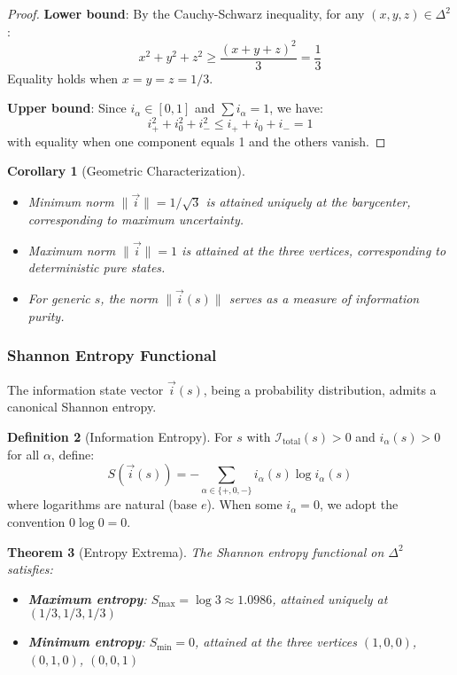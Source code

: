 \documentclass[12pt]{article}
\theoremstyle{plain}
\newtheorem{theorem}{Theorem}[section]
\newtheorem{corollary}[theorem]{Corollary}
\theoremstyle{definition}
\newtheorem{definition}[theorem]{Definition}
\begin{document}
\begin{proof}
\textbf{Lower bound}: By the Cauchy-Schwarz inequality, for any $(x,y,z) \in \Delta^2$:
$$x^2 + y^2 + z^2 \geq \frac{(x+y+z)^2}{3} = \frac{1}{3}$$
Equality holds when $x = y = z = 1/3$.

\textbf{Upper bound}: Since $i_\alpha \in [0,1]$ and $\sum i_\alpha = 1$, we have:
$$i_+^2 + i_0^2 + i_-^2 \leq i_+ + i_0 + i_- = 1$$
with equality when one component equals 1 and the others vanish.
\end{proof}

\begin{corollary}[Geometric Characterization]
\begin{itemize}
\item Minimum norm $\|\vec{i}\| = 1/\sqrt{3}$ is attained uniquely at the barycenter, corresponding to maximum uncertainty.
\item Maximum norm $\|\vec{i}\| = 1$ is attained at the three vertices, corresponding to deterministic pure states.
\item For generic $s$, the norm $\|\vec{i}(s)\|$ serves as a measure of information purity.
\end{itemize}
\end{corollary}

\subsubsection{Shannon Entropy Functional}

The information state vector $\vec{i}(s)$, being a probability distribution, admits a canonical Shannon entropy.

\begin{definition}[Information Entropy]\label{def:entropy}
For $s$ with $\mathcal{I}_{\text{total}}(s) > 0$ and $i_\alpha(s) > 0$ for all $\alpha$, define:
\begin{equation}
S\left(\vec{i}(s)\right) = -\sum_{\alpha \in \{+, 0, -\}} i_\alpha(s) \log i_\alpha(s)
\end{equation}
where logarithms are natural (base $e$). When some $i_\alpha = 0$, we adopt the convention $0 \log 0 = 0$.
\end{definition}

\begin{theorem}[Entropy Extrema]\label{thm:entropy_extrema}
The Shannon entropy functional on $\Delta^2$ satisfies:
\begin{itemize}
\item \textbf{Maximum entropy}: $S_{\max} = \log 3 \approx 1.0986$, attained uniquely at $(1/3, 1/3, 1/3)$
\item \textbf{Minimum entropy}: $S_{\min} = 0$, attained at the three vertices $(1,0,0)$, $(0,1,0)$, $(0,0,1)$
\end{itemize}
\end{theorem}
\end{document}
